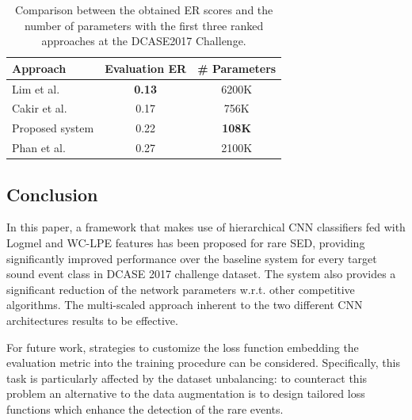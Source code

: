 \begin{table}[t]
	\centering
	\begin{tabular}{|l|c|c|}
		\hline
		Approach        & Evaluation ER & \# Parameters \\ \hline
		Lim et al. \cite{limrare}      & \textbf{0.13}                               & 6200K          \\ 
		Cakir et al.  \cite{cakirconvolutional}   & 0.17                               & 756K          \\ 
		Proposed system & 0.22                               & \textbf{108K}         \\ 
		Phan et al. \cite{phan2017dnn}   & 0.27                               & 2100K          \\ \hline
	\end{tabular}
	\caption[Rare Sound Event Detection - Comparative Results]{Comparison between the obtained ER scores and the number of parameters with the first three ranked approaches at the DCASE2017 Challenge.}
	\label{tab:params}
\end{table}


\subsection{Conclusion}
In this paper, a framework that makes use of hierarchical CNN classifiers fed with Logmel and WC-LPE features has been proposed for rare SED, providing significantly improved performance over the baseline system for every target sound event class in DCASE 2017 challenge dataset. The system also provides a significant reduction of the network parameters w.r.t. other competitive algorithms.  
The multi-scaled approach inherent to the two different CNN architectures results to be effective. 

For future work, strategies to customize the loss function embedding the evaluation metric into the training procedure can be considered. Specifically, this task is particularly affected by the dataset unbalancing: to counteract this problem an alternative to the data augmentation is to design tailored loss functions which enhance the detection of the rare events. 

